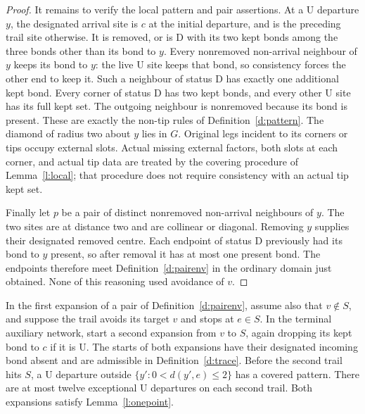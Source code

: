 \begin{proof}
It remains to verify the local pattern and pair assertions.  At a
\(\mathrm U\) departure \(y\), the designated arrival site is
\(c\) at the initial departure, and is the preceding trail site
otherwise.  It is removed, or is \(\mathrm D\) with its two kept
bonds among the three bonds other than its bond to \(y\).
Every nonremoved non-arrival neighbour of \(y\) keeps its bond to
\(y\): the live \(\mathrm U\) site keeps that bond, so consistency
forces the other end to keep it.  Such a neighbour of status
\(\mathrm D\) has exactly one additional kept bond.  Every corner
of status \(\mathrm D\) has two kept bonds, and every other
\(\mathrm U\) site has its full kept set.  The outgoing neighbour
is nonremoved because its bond is present.  These are exactly the
non-tip rules of Definition~\ref{d:pattern}.  The diamond of radius
two about \(y\) lies in \(G\).  Original legs incident to its
corners or tips occupy external slots.  Actual missing external
factors, both slots at each corner, and actual tip data are treated
by the covering procedure of Lemma~\ref{l:local}; that procedure
does not require consistency with an actual tip kept set.

Finally let \(p\) be a pair of distinct nonremoved non-arrival
neighbours of \(y\).  The two sites are at distance two and are
collinear or diagonal.  Removing \(y\) supplies their designated
removed centre.  Each endpoint of status \(\mathrm D\) previously
had its bond to \(y\) present, so after removal it has at most one
present bond.  The endpoints therefore meet
Definition~\ref{d:pairenv} in the ordinary domain just obtained.
None of this reasoning used avoidance of \(v\).
\end{proof}


\begin{lemma}\label{l:terminalcover}
In the first expansion of a pair of Definition~\ref{d:pairenv},
assume also that \(v\notin S\), and
suppose the trail avoids its target \(v\) and stops at \(e\in S\).
In the terminal auxiliary network, start a second expansion from \(v\)
to \(S\), again dropping its kept bond to \(c\) if it is \(\mathrm U\).
The starts of both expansions have their designated incoming bond
absent and are admissible in Definition~\ref{d:trace}.
Before the second trail hits \(S\), a \(\mathrm U\) departure
outside \(\{y':0<d(y',e)\le2\}\) has a covered pattern.
There are at most twelve exceptional \(\mathrm U\) departures
on each second trail. Both expansions satisfy Lemma~\ref{l:onepoint}.
\end{lemma}

